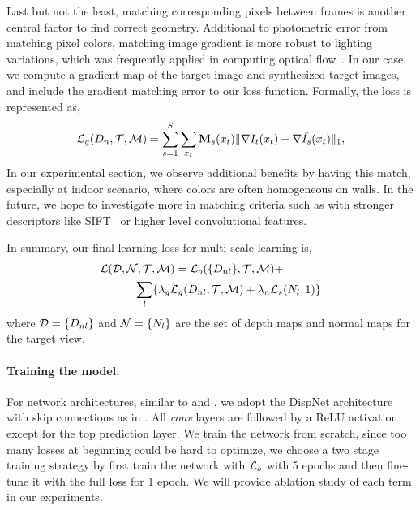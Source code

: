 Last but not the least, matching corresponding pixels between frames is another central factor to find correct geometry. Additional to photometric error from matching pixel colors, matching image gradient is more robust to lighting variations, which was frequently applied in computing optical flow~\cite{li2017pyramidal}. 
In our case, we compute a gradient map of the target image and synthesized target images, and include the gradient matching error to our loss function. Formally, the loss is represented as,
\begin{align}
\label{equ:gradient}
{\mathcal L}_{g}(D_n, {\mathcal T}, {\mathcal M}) = \sum_{s=1}^{S}\sum_{x_t}{\mathbf M}_s(x_t)\|\nabla I_t(x_t) - \nabla \hat{I_s}(x_t)\|_1, \nonumber
\end{align}
In our experimental section, we observe additional benefits by having this match, especially at indoor scenario, where colors are often homogeneous on walls.
In the future, we hope to investigate more in matching criteria such as with stronger descriptors like SIFT~\cite{liu2011sift} or higher level convolutional features.

In summary, our final learning loss for multi-scale learning is,
\begin{align}
&{\mathcal L}({\mathcal D}, {\mathcal N}, {\mathcal T}, {\mathcal M}) = {\mathcal L}_{o}(\{D_{nl}\}, {\mathcal T}, {\mathcal M}) + \nonumber\\
&\text{~~~~~~~~~}\sum_l\{\lambda_g{\mathcal L}_{g}(D_{nl},{\mathcal T},{\mathcal M}) + \lambda_n{\mathcal L}_{s}(N_l, 1)\}
\end{align}
where ${\mathcal D} = \{D_{nl}\}$ and ${\mathcal N} = \{N_{l}\}$ are the set of depth maps and normal maps for the target view.


\paragraph{Training the model.} For network architectures, similar to \cite{zhou2017unsupervised} and \cite{godard2016unsupervised}, we adopt the DispNet \cite{mayer2016large} architecture with skip connections as in \cite{zhou2017unsupervised}. All \textit{conv} layers are followed by a ReLU activation except for the top prediction layer. We train the network from scratch, since too many losses at beginning could be hard to optimize, we choose a two stage training strategy by first train the network with ${\mathcal L}_{o}$ with 5 epochs and then fine-tune it with the full loss for 1 epoch. We will provide ablation study of each term in our experiments.



